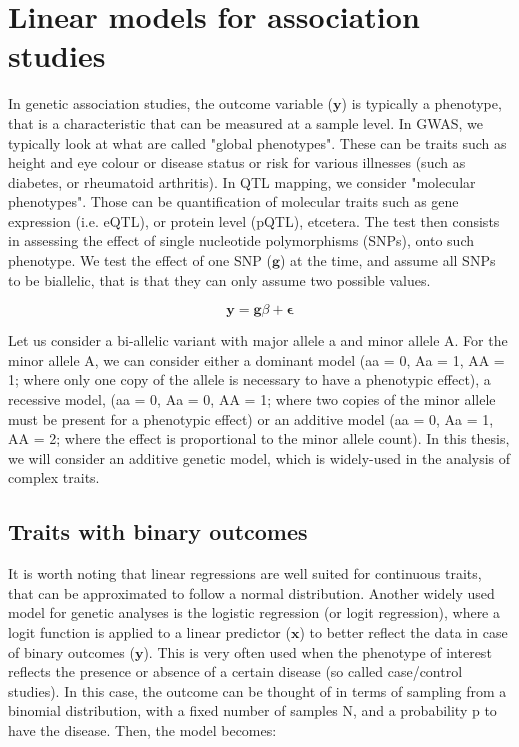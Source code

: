 
\section{Linear models for association studies}

In genetic association studies, the outcome variable ($\mathbf{y}$) is typically a phenotype, that is a characteristic that can be measured at a sample level. 
In GWAS, we typically look at what are called "global phenotypes".
These can be traits such as height and eye colour or disease status or risk for various illnesses (such as diabetes, or rheumatoid arthritis).
In QTL mapping, we consider "molecular phenotypes". 
Those can be quantification of molecular traits such as gene expression (i.e. eQTL), or protein level (pQTL), etcetera. 
The test then consists in assessing the effect of single nucleotide polymorphisms (SNPs),  onto such phenotype. 
We test the effect of one SNP ($\mathbf{g}$) at the time, and assume all SNPs to be biallelic, that is that they can only assume two possible values. 

\begin{equation}\label{eq12:Linear_regression_genetics}
 \mathbf{y} = \mathbf{g}\beta + \boldsymbol{\epsilon} 
\end{equation}

Let us consider a bi-allelic variant with major allele a and minor allele A. 
For the minor allele A, we can consider either a dominant model (aa = 0, Aa = 1, AA = 1; where only one copy of the allele is necessary to have a phenotypic effect), a recessive model, (aa = 0, Aa = 0, AA = 1; where two copies of the minor allele must be present for a phenotypic effect) or an additive model (aa = 0, Aa = 1, AA = 2; where the effect is proportional to the minor allele count). 
In this thesis, we will consider an additive genetic model, which is widely-used in the analysis of complex traits.

\subsection{Traits with binary outcomes}

It is worth noting that linear regressions are well suited for continuous traits, that can be approximated to follow a normal distribution. 
Another widely used model for genetic analyses is the logistic regression (or logit regression), where a logit function is applied to a linear predictor ($\mathbf{x}$) to better reflect the data in case of binary outcomes ($\mathbf{y}$). 
This is very often used when the phenotype of interest reflects the presence or absence of a certain disease (so called case/control studies).
In this case, the outcome can be thought of in terms of sampling from a binomial distribution, with a fixed number of samples N, and a probability p to have the disease. Then, the model becomes:

